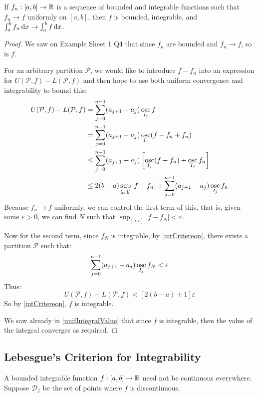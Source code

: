 \documentclass[../main.tex]{subfiles}
\begin{document}
\begin{theorem}
  If $f_n: [a, b] \to \mathbb{R}$ is a sequence of bounded and integrable functions such that $f_n \to f$ uniformly on $[a, b]$, then $f$ is bounded, integrable, and $\int_{a}^{b} f_n \d{x} \to \int_{a}^{b} f \d{x}$. \label{unifPresInt}
\end{theorem}
\begin{proof}
  We saw on Example Sheet 1 Q4 that since $f_n$ are bounded and $f_n \to f$, so is $f$.

  For an arbitrary partition $\mathcal{P}$, we would like to introduce $f - f_n$ into an expression for $U(\mathcal{P}, f) - L(\mathcal{P}, f)$ and then hope to use both uniform convergence and integrability to bound this:
  \begin{align*}
    U(\mathcal{P}, f) - L(\mathcal{P}, f)  &= \sum_{j = 0}^{n - 1} (a_{j + 1} - a_j) \operatorname*{osc}_{I_j} f \\
                                           &= \sum_{j = 0}^{n - 1} (a_{j + 1} - a_j) \operatorname*{osc}_{I_j} (f - f_n + f_n) \\
                                           &\leq \sum_{j = 0}^{n - 1} (a_{j + 1} - a_j) \left[\operatorname*{osc}_{I_j}(f - f_n) + \operatorname*{osc}_{I_j} f_n\right] \\
                                           &\leq 2(b - a) \sup_{[a, b]} |f - f_n| + \sum_{j = 0}^{n - 1} (a_{j + 1} - a_j) \operatorname*{osc}_{I_j} f_n
  \end{align*}
  Because $f_n \to f$ uniformly, we can control the first term of this, that is, given some $\varepsilon > 0$, we can find $N$ such that $\sup_{[a, b]} |f - f_N| < \varepsilon$.

  Now for the second term, since $f_N$ is integrable, by \cref{intCritereon}, there exists a partition $\mathcal{P}$ such that:
  \[
    \sum_{j = 0}^{n - 1} (a_{j + 1} - a_j) \operatorname*{osc}_{I_j} f_N < \varepsilon
  \]
  Thus:
  \[
    U(\mathcal{P}, f) - L(\mathcal{P}, f) < [2(b - a) + 1]\varepsilon
  \]
  So by \cref{intCritereon}, $f$ is integrable.

  We saw already in \cref{unifIntegralValue} that since $f$ is integrable, then the value of the integral converges as required.
\end{proof}
\subsection{Lebesgue's Criterion for Integrability}
\nonexaminable

A bounded integrable function $f: [a, b] \to \mathbb{R}$ need not be continuous everywhere.
Suppose $\mathcal{D}_f$ be the set of points where $f$ is discontinuous.
\end{document}

